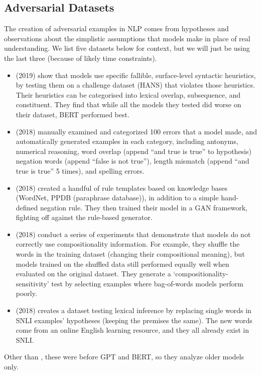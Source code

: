 \documentclass[letterpaper]{article}
\begin{document}
\subsection{Adversarial Datasets}
The creation of adversarial examples in NLP comes from hypotheses and observations about the simplistic assumptions that models make in place of real understanding.
We list five datasets below for context, but we will just be using the last three (because of likely time constraints).
\begin{itemize}
	\item \citeauthor{mccoy_right_2019} (2019) show that models use specific fallible, surface-level syntactic heuristics, by testing them on a challenge dataset (HANS) that violates those heuristics.
	Their heuristics can be categorised into lexical overlap, subsequence, and constituent.
	They find that while all the models they tested did worse on their dataset, BERT performed best.
	\item \citeauthor{naik_stress_2018} (2018) manually examined and categorized 100 errors that a model made, and automatically generated examples in each category, including antonyms, numerical reasoning, word overlap (append ``and true is true'' to hypothesis) negation words (append ``false is not true''), length mismatch (append ``and true is true'' 5 times), and spelling errors.
	\item \textbf{\citeauthor{kang_adventure:_2018}} (2018) created a handful of rule templates based on knowledge bases (WordNet, PPDB (paraphrase database)), in addition to a simple hand-defined negation rule.
	They then trained their model in a GAN framework, fighting off against the rule-based generator.
	\item \textbf{\citeauthor{nie_analyzing_2018}} (2018) conduct a series of experiments that demonstrate that models do not correctly use compositionality information.
	For example, they shuffle the words in the training dataset (changing their compositional meaning), but models trained on the shuffled data still performed equally well when evaluated on the original dataset.
	They generate a `compositionality-sensitivity' test by selecting examples where bag-of-words models perform poorly.
	\item \textbf{\citeauthor{glockner_breaking_2018}} (2018) creates a dataset testing lexical inference by replacing single words in SNLI examples' hypotheses (keeping the premises the same).
	The new words come from an online English learning resource, and they all already exist in SNLI.
\end{itemize}
Other than \citeauthor{mccoy_right_2019}, these were before GPT and BERT, so they analyze older models only.
\end{document}
